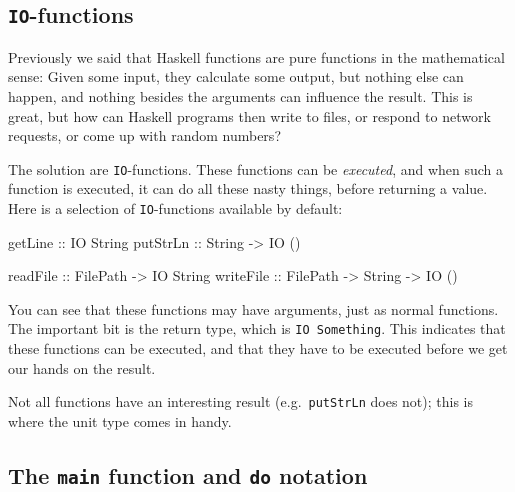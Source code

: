 \documentclass[11pt,
  american,
  DIV13]{article}
\newenvironment{Shaded}{}{}
\newcommand{\DataTypeTok}[1]{\textcolor[rgb]{0.56,0.13,0.00}{#1}}
\newcommand{\FunctionTok}[1]{\textcolor[rgb]{0.02,0.16,0.49}{#1}}
\newcommand{\NormalTok}[1]{#1}
\newcommand{\OtherTok}[1]{\textcolor[rgb]{0.00,0.44,0.13}{#1}}
\begin{document}
\hypertarget{io-functions}{%
\subsection{\texorpdfstring{\texttt{IO}-functions}{IO-functions}}\label{io-functions}}

Previously we said that Haskell functions are pure functions in the
mathematical sense: Given some input, they calculate some output, but
nothing else can happen, and nothing besides the arguments can influence
the result. This is great, but how can Haskell programs then write to
files, or respond to network requests, or come up with random numbers?

The solution are \texttt{IO}-functions. These functions can be
\emph{executed}, and when such a function is executed, it can do all
these nasty things, before returning a value. Here is a selection of
\texttt{IO}-functions available by default:

\begin{Shaded}
\begin{Highlighting}[]
\FunctionTok{getLine}\OtherTok{ ::} \DataTypeTok{IO} \DataTypeTok{String}
\FunctionTok{putStrLn}\OtherTok{ ::} \DataTypeTok{String} \OtherTok{{-}\textgreater{}} \DataTypeTok{IO}\NormalTok{ ()}

\FunctionTok{readFile}\OtherTok{ ::} \DataTypeTok{FilePath} \OtherTok{{-}\textgreater{}} \DataTypeTok{IO} \DataTypeTok{String}
\FunctionTok{writeFile}\OtherTok{ ::} \DataTypeTok{FilePath} \OtherTok{{-}\textgreater{}} \DataTypeTok{String} \OtherTok{{-}\textgreater{}} \DataTypeTok{IO}\NormalTok{ ()}
\end{Highlighting}
\end{Shaded}

You can see that these functions may have arguments, just as normal
functions. The important bit is the return type, which is
\texttt{IO\ Something}. This indicates that these functions can be
executed, and that they have to be executed before we get our hands on
the result.

Not all functions have an interesting result (e.g.~\texttt{putStrLn}
does not); this is where the unit type comes in handy.

\hypertarget{the-main-function-and-do-notation}{%
\subsection{\texorpdfstring{The \texttt{main} function and \texttt{do}
notation}{The main function and do notation}}\label{the-main-function-and-do-notation}}
\end{document}
